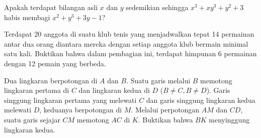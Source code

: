 \documentclass[12pt]{scrartcl}
\begin{document}
	\begin{soalbaru} Apakah terdapat bilangan asli $x$ dan $y$ sedemikian sehingga $x^3+xy^3+y^2+3$ habis membagi $x^2+y^3+3y-1$?
	\end{soalbaru}
	
	\begin{soalbaru} Terdapat 20 anggota di suatu klub tenis yang menjadwalkan tepat 14 permainan antar dua orang diantara mereka dengan setiap anggota klub bermain minimal satu kali. Buktikan bahwa dalam pembagian ini, terdapat himpunan 6 permainan dengan 12 pemain yang berbeda.
	\end{soalbaru}
	
	\begin{soalbaru} Dua lingkaran berpotongan di $A$ dan $B$. Suatu garis melalui $B$ memotong lingkaran pertama di $C$ dan lingkaran kedua di $D$ ($B \neq C, B \neq D$).  Garis singgung lingkaran pertama yang melewati $C$ dan garis singgung lingkaran kedua melewati $D$, keduanya berpotongan di $M$. Melalui perpotongan $AM$ dan $CD$, suatu garis sejajar $CM$ memotong $AC$ di $K$. Buktikan bahwa $BK$ menyinggung lingkaran kedua.
	\end{soalbaru}
	
\end{document}
